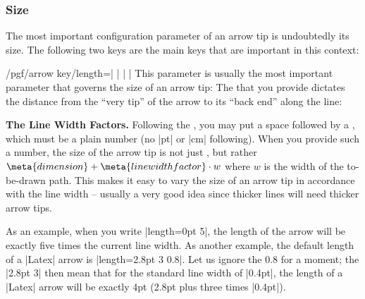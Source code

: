\subsubsection{Size}

The most important configuration parameter of an arrow tip is
undoubtedly its size. The following two keys are the main keys that
are important in this context:

\begin{key}{/pgf/arrow key/length=| |%
    | |}
  This parameter is usually the most important parameter that governs
  the size of an arrow tip: The  that you provide
  dictates the distance from the ``very tip'' of the arrow to its
  ``back end'' along the line:
\begin{codeexample}[]
\end{codeexample}
\begin{codeexample}[]
\end{codeexample}
\begin{codeexample}[]
\end{codeexample}

  \medskip
  \noindent \textbf{The Line Width Factors.}
  Following the , you may put a space followed by a
  , which must be a plain number (no |pt| or
  |cm| following). When you provide such a number, the size of the
  arrow tip is not just , but rather $\meta{dimension}
  + \meta{line width factor}\cdot w$ where
  $w$ is the width of the to-be-drawn path. This
  makes it easy to vary the size of an arrow tip in accordance with
  the line width -- usually a very good idea since thicker lines will
  need thicker arrow tips. 

  As an example, when you write |length=0pt 5|, the length of the
  arrow will be exactly five times the current line width. As another
  example, the default length of a |Latex| arrow is
  |length=2.8pt 3 0.8|. Let us ignore the 0.8 for a moment; the
  |2.8pt 3| then mean that for the standard line width of
  |0.4pt|, the length of a |Latex| arrow will be exactly 4pt (2.8pt
  plus three times |0.4pt|). 


\end{key}
